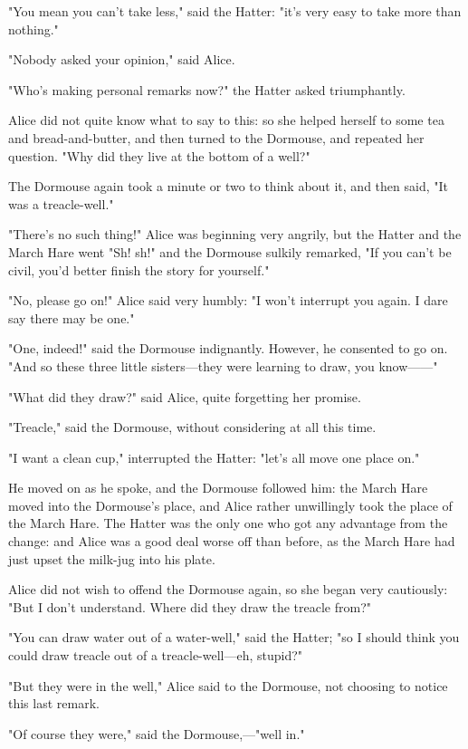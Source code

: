 "You mean you can't take less," said the Hatter: "it's very easy to take more than nothing."

"Nobody asked your opinion," said Alice.

"Who's making personal remarks now?" the Hatter asked triumphantly.

Alice did not quite know what to say to this: so she helped herself to some tea and ​bread-and-butter, and then turned to the Dormouse, and repeated her question. "Why did they live at the bottom of a well?"

The Dormouse again took a minute or two to think about it, and then said, "It was a treacle-well."

"There's no such thing!" Alice was beginning very angrily, but the Hatter and the March Hare went "Sh! sh!" and the Dormouse sulkily remarked, "If you can't be civil, you'd better finish the story for yourself."

"No, please go on!" Alice said very humbly: "I won't interrupt you again. I dare say there may be one."

"One, indeed!" said the Dormouse indignantly. However, he consented to go on. "And so these three little sisters—they were learning to draw, you know——"

"What did they draw?" said Alice, quite forgetting her promise.

"Treacle," said the Dormouse, without considering at all this time.

​"I want a clean cup," interrupted the Hatter: "let's all move one place on."

He moved on as he spoke, and the Dormouse followed him: the March Hare moved into the Dormouse's place, and Alice rather unwillingly took the place of the March Hare. The Hatter was the only one who got any advantage from the change: and Alice was a good deal worse off than before, as the March Hare had just upset the milk-jug into his plate.

Alice did not wish to offend the Dormouse again, so she began very cautiously: "But I don't understand. Where did they draw the treacle from?"

"You can draw water out of a water-well," said the Hatter; "so I should think you could draw treacle out of a treacle-well—eh, stupid?"

"But they were in the well," Alice said to the Dormouse, not choosing to notice this last remark.

"Of course they were," said the Dormouse,—"well in."

